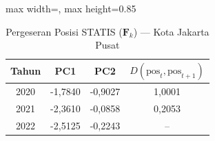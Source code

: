 \begin{table}[H]
\centering
\caption{Pergeseran Posisi STATIS ($\mathbf{F}_k$) --- Kota Jakarta Pusat} \label{tab:sample1jarak_statis_skor_kota_jakarta_pusat}
\begin{adjustbox}{max width=\textwidth, max height=0.85\textheight}
\begin{tabular}{|c|c|c|c|}
\hline
\textbf{Tahun} & \textbf{PC1} & \textbf{PC2} & \textbf{$D(\text{pos}_t, \text{pos}_{t+1})$} \\
\hline
2020 & -1,7840 & -0,9027 & 1,0001 \\
2021 & -2,3610 & -0,0858 & 0,2053 \\
2022 & -2,5125 & -0,2243 & -- \\
\hline
\end{tabular}
\end{adjustbox}
\end{table}